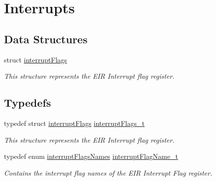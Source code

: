 \hypertarget{group__interrupts}{}\section{Interrupts}
\label{group__interrupts}
\subsection*{Data Structures}
\begin{DoxyCompactItemize}
\item 
struct \mbox{\hyperlink{structinterrupt_flags}{interrupt\+Flags}}
\begin{DoxyCompactList}\small\item\em This structure represents the E\+IR Interrupt flag register. \end{DoxyCompactList}\end{DoxyCompactItemize}
\subsection*{Typedefs}
\begin{DoxyCompactItemize}
\item 
typedef struct \mbox{\hyperlink{structinterrupt_flags}{interrupt\+Flags}} \mbox{\hyperlink{group__interrupts_ga337298055be267e726930c9fc6b2d4eb}{interrupt\+Flags\+\_\+t}}
\begin{DoxyCompactList}\small\item\em This structure represents the E\+IR Interrupt flag register. \end{DoxyCompactList}\item 
typedef enum \mbox{\hyperlink{group__interrupts_gaf692e993b72f242633eee1b443276547}{interrupt\+Flags\+Names}} \mbox{\hyperlink{group__interrupts_gaa2c8c63912e19f8bccebc09dfc23023a}{interrupt\+Flag\+Name\+\_\+t}}
\begin{DoxyCompactList}\small\item\em Contains the interrupt flag names of the E\+IR Interrupt Flag register. \end{DoxyCompactList}\end{DoxyCompactItemize}
